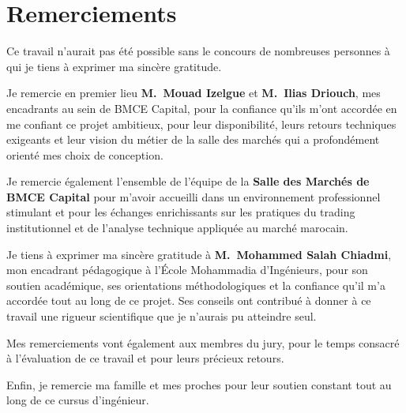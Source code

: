 \chapter*{Remerciements}
\thispagestyle{plain}

Ce travail n'aurait pas été possible sans le concours de nombreuses personnes à qui je tiens
à exprimer ma sincère gratitude.

\medskip

Je remercie en premier lieu \textbf{M.~Mouad Izelgue} et \textbf{M.~Ilias Driouch},
mes encadrants au sein de BMCE Capital, pour la confiance qu'ils m'ont accordée en me
confiant ce projet ambitieux, pour leur disponibilité, leurs retours techniques exigeants
et leur vision du métier de la salle des marchés qui a profondément orienté mes choix de
conception.

\medskip

Je remercie également l'ensemble de l'équipe de la \textbf{Salle des Marchés de BMCE Capital}
pour m'avoir accueilli dans un environnement professionnel stimulant et pour les échanges
enrichissants sur les pratiques du trading institutionnel et de l'analyse technique
appliquée au marché marocain.

\medskip

Je tiens à exprimer ma sincère gratitude à \textbf{M.~Mohammed Salah Chiadmi},
mon encadrant pédagogique à l'École Mohammadia d'Ingénieurs, pour son soutien académique,
ses orientations méthodologiques et la confiance qu'il m'a accordée tout au long de ce
projet. Ses conseils ont contribué à donner à ce travail une rigueur scientifique que je
n'aurais pu atteindre seul.

\medskip

Mes remerciements vont également aux membres du jury, pour le temps consacré à l'évaluation
de ce travail et pour leurs précieux retours.

\medskip

Enfin, je remercie ma famille et mes proches pour leur soutien constant tout au long de
ce cursus d'ingénieur.
